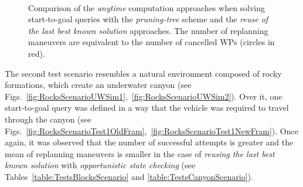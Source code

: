 \begin{figure}[htbp]
\myfloatalign
     \quad
     \\
     \quad
\caption[Comparison of the \textit{anytime} computation approaches when solving
start-to-goal queries without an initial map.]
{Comparison of the \textit{anytime} computation approaches when solving
start-to-goal queries with the \textit{pruning-tree} scheme and the
\textit{reuse of the last best known solution} approaches. The number of
replanning maneuvers are equivalent to the number of cancelled \acp{WP} (circles
in red).}
\label{fig:TestsBlocksScenario}
\end{figure}

The second test scenario resembles a natural environment composed of rocky
formations, which create an underwater canyon (see
Figs.~\ref{fig:RocksScenarioUWSim1},~\ref{fig:RocksScenarioUWSim2}). Over it,
one start-to-goal query was defined in a way that the vehicle was required to
travel through the canyon (see
Figs.~\ref{fig:RocksScenarioTest1OldFram},~\ref{fig:RocksScenarioTest1NewFram}).
Once again, it was observed that the number of successful attempts is greater
and the mean of replanning maneuvers is smaller in the case of \textit{reusing
the last best known solution} with \textit{opportunistic state checking} (see
Tables~\ref{table:TestsBlocksScenario} and \ref{table:TestsCanyonScenario}).

